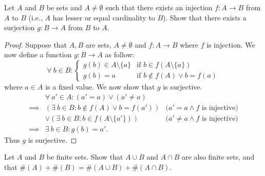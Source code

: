 \begin{exercise}\label{ex 3.6.8}
    Let \(A\) and \(B\) be sets and \(A \neq \emptyset\) such that there exists an injection \(f : A \to B\) from \(A\) to \(B\) (i.e., \(A\) has lesser or equal cardinality to \(B\)).
    Show that there exists a surjection \(g : B \to A\) from \(B\) to \(A\).
\end{exercise}

\begin{proof}
    Suppose that \(A, B\) are sets, \(A \neq \emptyset\) and \(f : A \to B\) where \(f\) is injection.
    We now define a function \(g : B \to A\) as follow:
    \[
        \forall\ b \in B : \begin{cases}
            g(b) \in A \setminus \{a\} & \text{if } b \in f(A \setminus \{a\})  \\
            g(b) = a                   & \text{if } b \notin f(A) \lor b = f(a)
        \end{cases}
    \]
    where \(a \in A\) is a fixed value.
    We now show that \(g\) is surjective.
    \begin{align*}
                 & \forall\ a' \in A : (a' = a) \lor (a' \neq a)                                                       \\
        \implies & (\exists\ b \in B : b \notin f(A) \lor b = f(a'))     & \text{(\(a' = a \land f\) is injective)}    \\
                 & \lor (\exists\ b \in B : b \in f(A \setminus \{a'\})) & \text{(\(a' \neq a \land f\) is injective)} \\
        \implies & \exists\ b \in B : g(b) = a'.
    \end{align*}
    Thus \(g\) is surjective.
\end{proof}

\begin{exercise}\label{ex 3.6.9}
    Let \(A\) and \(B\) be finite sets.
    Show that \(A \cup B\) and \(A \cap B\) are also finite sets, and that \(\#(A) + \#(B) = \#(A \cup B) + \#(A \cap B)\).
\end{exercise}

